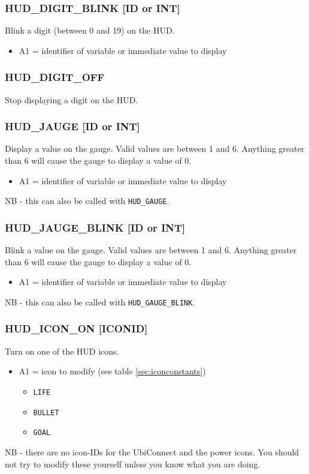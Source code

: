 \documentclass[12pt,a4paper]{scrbook}
\begin{document}
\subsubsection{HUD\_DIGIT\_BLINK [ID or INT]}
Blink a digit (between 0 and 19) on the HUD. 
\begin{itemize}
\item A1 = identifier of variable or immediate value to display
\end{itemize}

\subsubsection{HUD\_DIGIT\_OFF}
Stop displaying a digit on the HUD.



\subsubsection{HUD\_JAUGE [ID or INT]}
Display a value on the gauge.  Valid values are between 1 and 6.  Anything greater
than 6 will cause the gauge to display a value of 0.  
\begin{itemize}
\item A1 = identifier of variable or immediate value to display
\end{itemize}
NB - this can also be called with \texttt{HUD\_GAUGE}.

\subsubsection{HUD\_JAUGE\_BLINK [ID or INT]}
Blink a value on the gauge.  Valid values are between 1 and 6.  Anything greater
than 6 will cause the gauge to display a value of 0.  
\begin{itemize}
\item A1 = identifier of variable or immediate value to display
\end{itemize}
NB - this can also be called with \texttt{HUD\_GAUGE\_BLINK}.

\subsubsection{HUD\_ICON\_ON [ICONID]}
Turn on one of the HUD icons.
\begin{itemize}
\item A1 = icon to modify (see table \ref{sec:iconconstants})
\begin{itemize}
\item \texttt{LIFE}
\item \texttt{BULLET}
\item \texttt{GOAL}
\end{itemize}
\end{itemize}
NB - there are no icon-IDs for the UbiConnect and the power icons.  You should not try to 
modify these yourself unless you know what you are doing.
\end{document}
